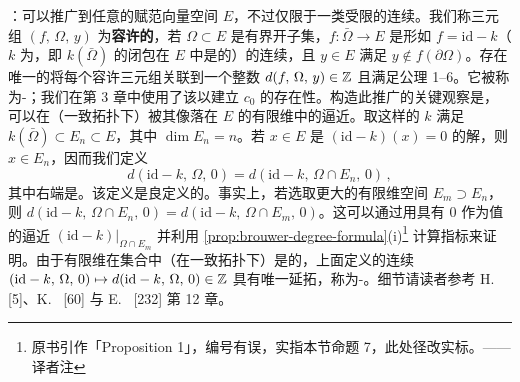 \trhRemark：\trBrouwer\trDegree{}可以推广到任意的赋范向量空间 $E$，不过仅限于一类受限的连续\trMapping{}。我们称三元组 $(f,\,\Omega,\,y)$ 为\textbf{容许的}，若 $\Omega\subset E$ 是有界开子集，$f:\bar{\Omega}\to E$ 是形如 $f=\mathrm{id}-k$（$k$ 为\trCompact{}\trMapping{}，即 $k(\bar{\Omega})$ 的闭包在 $E$ 中是\trCompact{}的）的连续\trMapping{}，且 $y\in E$ 满足 $y\notin f(\partial\Omega)$。存在唯一的\trMapping{}将每个容许三元组关联到一个整数 $d(f,\,\Omega,\,y)\in\mathbb{Z}$ 且满足公理 1--6。它被称为\trLeray-\trSchauder\trDegree；我们在第 3 章中使用了该\trDegree{}以建立\trSymplecticCapacity{} $c_0$ 的存在性。构造此推广的关键观察是，\trCompact{}\trMapping{}可以在（一致拓扑下）被其像落在 $E$ 的有限维\trSubspace{}中的\trCompact{}\trMapping{}逼近。取这样的\trMapping{} $k$ 满足 $k(\bar{\Omega})\subset E_n\subset E$，其中 $\dim E_n=n$。若 $x\in E$ 是
$(\mathrm{id}-k)(x)=0$
的解，则 $x\in E_n$，因而我们定义
\[d(\mathrm{id}-k,\,\Omega,\,0)=d(\mathrm{id}-k,\,\Omega\cap E_n,\,0)\,,\]
其中右端是\trBrouwer\trDegree。该定义是良定义的。事实上，若选取更大的有限维空间 $E_m\supset E_n$，则 $d(\mathrm{id}-k,\,\Omega\cap E_n,\,0)=d(\mathrm{id}-k,\,\Omega\cap E_m,\,0)$。这可以通过用具有 $0$ 作为\trRegular{}值的\trSmooth{}\trMapping{}逼近 $(\mathrm{id}-k)|_{\Omega\cap E_m}$ 并利用
\cref{prop:brouwer-degree-formula}(i)\footnote{原书引作「Proposition 1」，编号有误，实指本节命题 7，此处径改实标。——译者注} 计算指标来证明。由于有限维\trMapping{}在\trCompact{}\trMapping{}集合中（在一致拓扑下）是\trDense{}的，上面定义的连续\trMapping{} $(\mathrm{id}-k,\,\Omega,\,0)\mapsto d(\mathrm{id}-k,\,\Omega,\,0)\in\mathbb{Z}$ 具有唯一延拓，称为\trLeray-\trSchauder\trDegree。细节请读者参考 H.~\trAmann{} [5]、K.~\trDeimling{} [60] 与 E.~\trZeidler{} [232] 第 12 章。